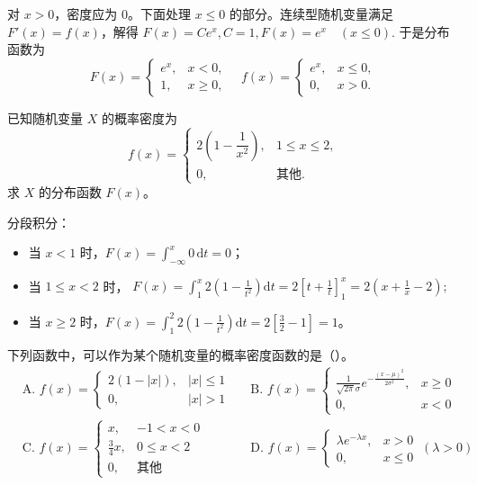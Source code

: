 \documentclass[lang=cn,11pt]{elegantbook}
\begin{document}
\begin{solution}
对 \(x>0\)，密度应为 0。下面处理 \(x\le 0\) 的部分。连续型随机变量满足 \(F'(x)=f(x)\)，解得
\(
F(x)=Ce^x,C=1,F(x)=e^x\quad(x\le 0).
\)
于是分布函数为
\[
F(x) = \begin{cases} e^x, & x < 0, \\ 1, & x \ge 0, \end{cases} \quad f(x) = \begin{cases} e^x, & x \le 0, \\ 0, & x > 0. \end{cases}
\]
\end{solution}


\begin{exercise}\label{exer:2-7}
已知随机变量 $X$ 的概率密度为
\[
f(x) = \begin{cases}
2\left(1 - \dfrac{1}{x^2}\right), & 1 \le x \le 2, \\
0, & \text{其他}.
\end{cases}
\]
求 $X$ 的分布函数 $F(x)$。
\end{exercise}

\begin{solution}
分段积分：
\begin{itemize}
    \item 当 $x < 1$ 时，$F(x) = \displaystyle\int_{-\infty}^x 0\,\mathrm{d}t = 0$；
    \item 当 $1 \le x < 2$ 时，
    \(
    F(x) = \int_1^x 2\left(1 - \frac{1}{t^2}\right)\mathrm{d}t = 2\left[t + \frac{1}{t}\right]_1^x = 2\left(x + \frac{1}{x} - 2\right);
    \)
    \item 当 $x \ge 2$ 时，$F(x) = \displaystyle\int_1^2 2\left(1 - \frac{1}{t^2}\right)\mathrm{d}t = 2\left[\frac{3}{2} - 1\right] = 1$。
\end{itemize}
\end{solution}

\begin{exercise}\label{exer:2-23}
下列函数中，可以作为某个随机变量的概率密度函数的是（\quad）。
\begin{align*}
&\text{A. } f(x) = \begin{cases} 2(1-|x|), & |x| \le 1 \\ 0, & |x|>1 \end{cases}
&&\text{B. } f(x) = \begin{cases} \frac{1}{\sqrt{2\pi}\sigma} e^{-\frac{(x-\mu)^2}{2\sigma^2}}, & x \ge 0 \\ 0, & x<0 \end{cases} \\
&\text{C. } f(x) = \begin{cases} x, & -1<x<0 \\ \frac{3}{4}x, & 0 \le x<2 \\ 0, & \text{其他} \end{cases}
&&\text{D. } f(x) = \begin{cases} \lambda e^{-\lambda x}, & x>0 \\ 0, & x \le 0 \end{cases} \ (\lambda>0)
\end{align*}
\end{exercise}
\end{document}
